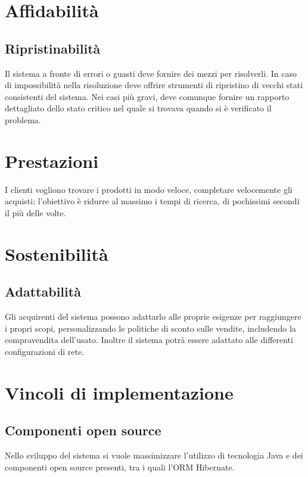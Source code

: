 \documentclass[a4paper,10pt]{report}
\begin{document}
 \section*{Affidabilità}
 \subsection*{Ripristinabilità}
Il sistema a fronte di errori o guasti deve fornire dei mezzi per risolverli. In caso di impossibilità nella risoluzione deve offrire strumenti di ripristino di vecchi stati consistenti del sistema. Nei casi più gravi, deve comunque fornire un rapporto dettagliato dello stato critico nel quale si trovava quando si è verificato il problema.

 \section*{Prestazioni}
I clienti vogliono trovare i prodotti in modo veloce, completare velocemente gli acquisti; l'obiettivo è ridurre al massimo i tempi di ricerca, di pochissimi secondi il più delle volte.

 \section*{Sostenibilità}
 \subsection*{Adattabilità}
Gli acquirenti del sistema possono adattarlo alle proprie esigenze per raggiungere i propri scopi, personalizzando le politiche di sconto sulle vendite, includendo la compravendita dell'usato. Inoltre il sistema potrà essere adattato alle differenti configurazioni di rete.


 \section*{Vincoli di implementazione}

 \subsection*{Componenti open source}
Nello sviluppo del sistema si vuole massimizzare l'utilizzo di tecnologia Java e dei componenti open source presenti, tra i quali l'ORM Hibernate.
\end{document}
